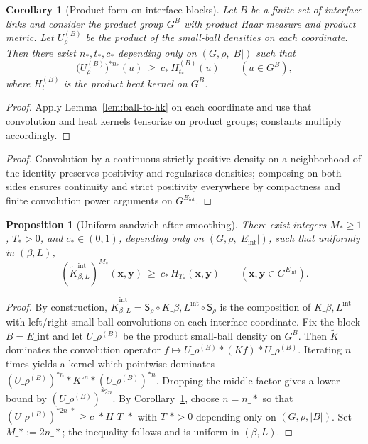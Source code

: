 \documentclass[11pt]{amsart}
\theoremstyle{plain}
\newtheorem{proposition}[theorem]{Proposition}
\newtheorem{corollary}[theorem]{Corollary}
\theoremstyle{definition}
\theoremstyle{remark}
\begin{document}
\begin{corollary}[Product form on interface blocks]\label{cor:product-ball-to-hk}
Let $B$ be a finite set of interface links and consider the product group $G^B$ with product Haar measure and product metric. Let $U_\rho^{(B)}$ be the product of the small-ball densities on each coordinate. Then there exist $n_\ast, t_\ast, c_\ast$ depending only on $(G,\rho,|B|)$ such that
\[
  \big(U_\rho^{(B)}\big)^{\ast n_\ast}(u)\ \ge\ c_\ast\, H_{t_\ast}^{(B)}(u)\qquad(u\in G^B),
\]
where $H_{t}^{(B)}$ is the product heat kernel on $G^B$.
\end{corollary}
\begin{proof}
Apply Lemma~\ref{lem:ball-to-hk} on each coordinate and use that convolution and heat kernels tensorize on product groups; constants multiply accordingly.
\end{proof}
\begin{proof}
Convolution by a continuous strictly positive density on a neighborhood of the identity preserves positivity and regularizes densities; composing on both sides ensures continuity and strict positivity everywhere by compactness and finite convolution power arguments on $G^{E_{\mathrm{int}}}$.
\end{proof}

\begin{proposition}[Uniform sandwich after smoothing]\label{prop:sandwich}
There exist integers $M_\ast\ge 1$, $T_\ast>0$, and $c_\ast\in(0,1)$, depending only on $(G,\rho,|E_{\mathrm{int}}|)$, such that uniformly in $(\beta,L)$,
\[
  (\widetilde K_{\beta,L}^{\mathrm{int}})^{M_\ast}(\mathbf x,\mathbf y)\ \ge\ c_\ast\, H_{T_\ast}(\mathbf x,\mathbf y)\qquad(\mathbf x,\mathbf y\in G^{E_{\mathrm{int}}}).
\]
\end{proposition}
\begin{proof}
By construction, $\widetilde K_{\beta,L}^{\mathrm{int}}=\mathsf S_\rho\circ K\_{\beta,L}^{\mathrm{int}}\circ \mathsf S_\rho$ is the composition of $K\_{\beta,L}^{\mathrm{int}}$ with left/right small-ball convolutions on each interface coordinate. Fix the block $B=E\_{\mathrm{int}}$ and let $U\_\rho^{(B)}$ be the product small-ball density on $G^B$. Then $\widetilde K$ dominates the convolution operator $f\mapsto U\_\rho^{(B)}\ast (K f)\ast U\_\rho^{(B)}$. Iterating $n$ times yields a kernel which pointwise dominates $(U\_\rho^{(B)})^{\ast n}\ast K^{\circ n}\ast (U\_\rho^{(B)})^{\ast n}$. Dropping the middle factor gives a lower bound by $(U\_\rho^{(B)})^{\ast 2n}$. By Corollary~\ref{cor:product-ball-to-hk}, choose $n=n\_\ast$ so that $(U\_\rho^{(B)})^{\ast 2n\_\ast}\ge c\_\ast H\_{T\_\ast}$ with $T\_\ast>0$ depending only on $(G,\rho,|B|)$. Set $M\_\ast:=2n\_\ast$; the inequality follows and is uniform in $(\beta,L)$.
\end{proof}
\end{document}
